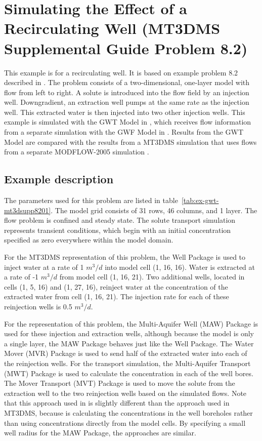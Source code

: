 \section{Simulating the Effect of a Recirculating Well (MT3DMS Supplemental Guide Problem 8.2)}

This example is for a recirculating well.  It is based on example problem 8.2 described in \cite{zheng2010mt3dmsv5.3}.  The problem consists of a two-dimensional, one-layer model with flow from left to right.  A solute is introduced into the flow field by an injection well.  Downgradient, an extraction well pumps at the same rate as the injection well.  This extracted water is then injected into two other injection wells.  This example is simulated with the GWT Model in \mf, which receives flow information from a separate simulation with the GWF Model in \mf.  Results from the GWT Model are compared with the results from a MT3DMS simulation \citep{zheng1990mt3d} that uses flows from a separate MODFLOW-2005 simulation \citep{modflow2005}.  

\subsection{Example description}

The parameters used for this problem are listed in table~\ref{tab:ex-gwt-mt3dsupp8201}.  The model grid consists of 31 rows, 46 columns, and 1 layer.  The flow problem is confined and steady state.  The solute transport simulation represents transient conditions, which begin with an initial concentration specified as zero everywhere within the model domain.

For the MT3DMS representation of this problem, the Well Package is used to inject water at a rate of 1 $m^3/d$ into model cell (1, 16, 16).  Water is extracted at a rate of -1 $m^3/d$ from model cell (1, 16, 21).  Two additional wells, located in cells (1, 5, 16) and (1, 27, 16), reinject water at the concentration of the extracted water from cell (1, 16, 21).  The injection rate for each of these reinjection wells is 0.5 $m^3/d$.

For the \mf representation of this problem, the Multi-Aquifer Well (MAW) Package is used for these injection and extraction wells, although because the model is only a single layer, the MAW Package behaves just like the Well Package.  The Water Mover (MVR) Package is used to send half of the extracted water into each of the reinjection wells.  For the \mf transport simulation, the Multi-Aquifer Transport (MWT) Package is used to calculate the concentration in each of the well bores.  The Mover Transport (MVT) Package is used to move the solute from the extraction well to the two reinjection wells based on the simulated flows.  Note that this approach used in \mf is slightly different than the approach used in MT3DMS, because \mf is calculating the concentrations in the well boreholes rather than using concentrations directly from the model cells.  By specifying a small well radius for the MAW Package, the approaches are similar.

